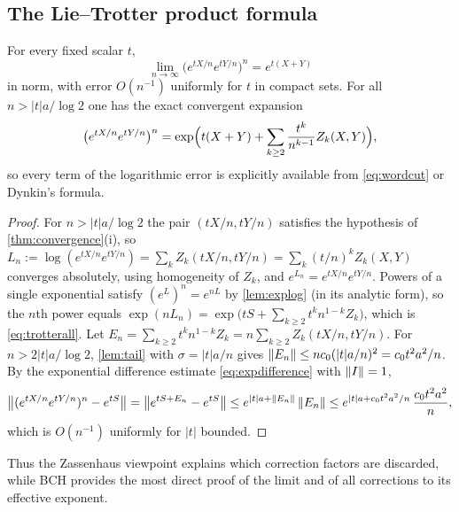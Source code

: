\subsection{The Lie--Trotter product formula}
\begin{theorem}\label{thm:trotter}
For every fixed scalar $t$,
\begin{equation}\label{eq:trotter}
 \lim_{n\to\infty}\bigl(e^{tX/n}e^{tY/n}\bigr)^n=e^{t(X+Y)}
\end{equation}
in norm, with error $O(n^{-1})$ uniformly for $t$ in compact sets. For all
$n>|t|a/\log2$ one has the exact convergent expansion
\begin{equation}\label{eq:trotterall}
 \bigl(e^{tX/n}e^{tY/n}\bigr)^n
 =\exp\Bigl(t(X+Y)+\sum_{k\geq2}\frac{t^k}{n^{k-1}}Z_k(X,Y)\Bigr),
\end{equation}
so every term of the logarithmic error is explicitly available from
\eqref{eq:wordcut} or Dynkin's formula.
\end{theorem}
\begin{proof}
For $n>|t|a/\log2$ the pair $(tX/n,tY/n)$ satisfies the hypothesis of
\cref{thm:convergence}(i), so $L_n:=\log(e^{tX/n}e^{tY/n})=\sum_kZ_k(tX/n,tY/n)
=\sum_k(t/n)^kZ_k(X,Y)$ converges absolutely, using homogeneity of $Z_k$, and
$e^{L_n}=e^{tX/n}e^{tY/n}$. Powers of a single exponential satisfy
$(e^{L})^n=e^{nL}$ by \cref{lem:explog} (in its analytic form), so the
$n$th power equals $\exp(nL_n)=\exp\bigl(tS+\sum_{k\geq2}t^kn^{1-k}Z_k\bigr)$,
which is \eqref{eq:trotterall}. Let $E_n=\sum_{k\geq2}t^kn^{1-k}Z_k
=n\sum_{k\geq2}Z_k(tX/n,tY/n)$. For $n>2|t|a/\log2$, \cref{lem:tail}
with $\sigma=|t|a/n$ gives $\left\lVert E_n\right\rVert\leq nc_0(|t|a/n)^2=c_0t^2a^2/n$.
By the exponential difference estimate \eqref{eq:expdifference} with
$\left\lVert I\right\rVert=1$,
\[
 \bigl\|(e^{tX/n}e^{tY/n})^n-e^{tS}\bigr\|=\left\lVert e^{tS+E_n}-e^{tS}\right\rVert
 \leq e^{|t|a+\left\lVert E_n\right\rVert}\left\lVert E_n\right\rVert\leq e^{|t|a+c_0t^2a^2/n}\,\frac{c_0t^2a^2}{n},
\]
which is $O(n^{-1})$ uniformly for $|t|$ bounded.
\end{proof}
Thus the Zassenhaus viewpoint explains which correction factors are
discarded, while BCH provides the most direct proof of the limit and of
all corrections to its effective exponent.

